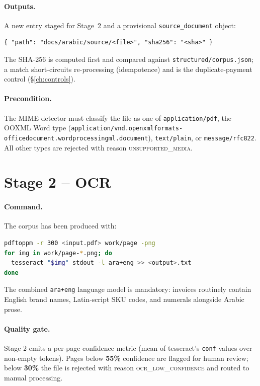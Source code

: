 \paragraph{Outputs.} A new entry staged for Stage~2 and a provisional
\texttt{source\_document} object:
\begin{lstlisting}[language=jsonx]
{ "path": "docs/arabic/source/<file>", "sha256": "<sha>" }
\end{lstlisting}
The SHA-256 is computed first and compared against
\corpus\texttt{structured/corpus.json}; a match short-circuits
re-processing (idempotence) and is the duplicate-payment control
(\S\ref{ch:controls}).

\paragraph{Precondition.} The MIME detector must classify the file as
one of \texttt{application/pdf}, the OOXML Word type
(\texttt{application/vnd.openxmlformats-\allowbreak officedocument.\allowbreak wordprocessingml.\allowbreak document}),
\texttt{text/plain}, or \texttt{message/rfc822}. All other types are
rejected with reason \textsc{unsupported\_media}.

\section{Stage 2 -- OCR}

\paragraph{Command.} The corpus has been produced with:
\begin{lstlisting}[language=bash,basicstyle=\ttfamily\small]
pdftoppm -r 300 <input.pdf> work/page -png
for img in work/page-*.png; do
  tesseract "$img" stdout -l ara+eng >> <output>.txt
done
\end{lstlisting}
The combined \texttt{ara+eng} language model is mandatory: invoices
routinely contain English brand names, Latin-script SKU codes, and
numerals alongside Arabic prose.

\paragraph{Quality gate.} Stage 2 emits a per-page confidence metric
(mean of tesseract's \texttt{conf} values over non-empty tokens). Pages
below \textbf{55\%} confidence are flagged for human review; below
\textbf{30\%} the file is rejected with reason \textsc{ocr\_low\_confidence}
and routed to manual processing.

